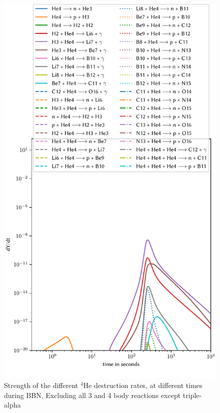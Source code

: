 \begin{figure}[ht]
    \includegraphics[width=5.1in]{figures/app/He4destruct.pdf}
    \caption{Strength of the different ${}^4$He destruction rates, at different times during BBN, Excluding all 3 and 4 body reactions except triple-alpha}
    \label{fig:He4destruct}
\end{figure}

